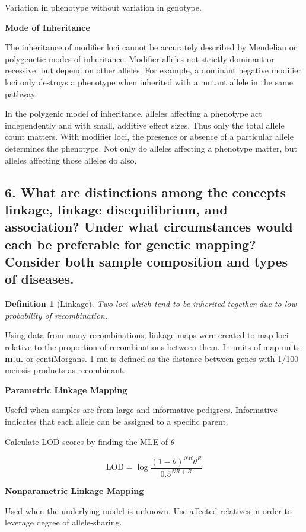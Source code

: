 \documentclass{tufte-handout}
\theoremstyle{noparens}
\newtheorem*{define}{Definition}
\begin{document}
Variation in phenotype without variation in genotype. 

\noindent
\textbf{Mode of Inheritance}

The inheritance of modifier loci cannot be accurately described by Mendelian or polygenetic modes of inheritance. Modifier alleles not strictly dominant or recessive, but depend on other alleles. For example, a dominant negative modifier loci only destroys a phenotype when inherited with a mutant allele in the same pathway.

In the polygenic model of inheritance, alleles affecting a phenotype act independently and with small, additive effect sizes. Thus only the total allele count matters. With modifier loci, the presence or absence of a particular allele determines the phenotype. Not only do alleles affecting a phenotype matter, but alleles affecting those alleles do also.

\newpage
\subsection{6.
What are distinctions among the concepts linkage, linkage disequilibrium, and association? Under what circumstances would each be preferable for genetic mapping? Consider both sample composition and types of diseases.}
\label{subsec:06}

\begin{define}[Linkage]
Two loci which tend to be inherited together due to low probability of recombination.
\end{define}

Using data from many recombinations, linkage maps were created to map loci relative to the proportion of recombinations between them. In units of map units \textbf{m.u.} or centiMorgans. 1 mu is defined as the distance between genes with 1/100 meiosis products as recombinant. 

\noindent
\textbf{Parametric Linkage Mapping}

Useful when samples are from large and informative pedigrees. Informative indicates that each allele can be assigned to 	a specific parent.

Calculate LOD scores by finding the MLE of $\theta$

\[ \text{LOD} = \log \frac{(1-\theta)^{NR}\theta^R}{0.5^{NR+R}} \]

\noindent
\textbf{Nonparametric Linkage Mapping}

Used when the underlying model is unknown. Use affected relatives in order to leverage degree of allele-sharing.
\end{document}
